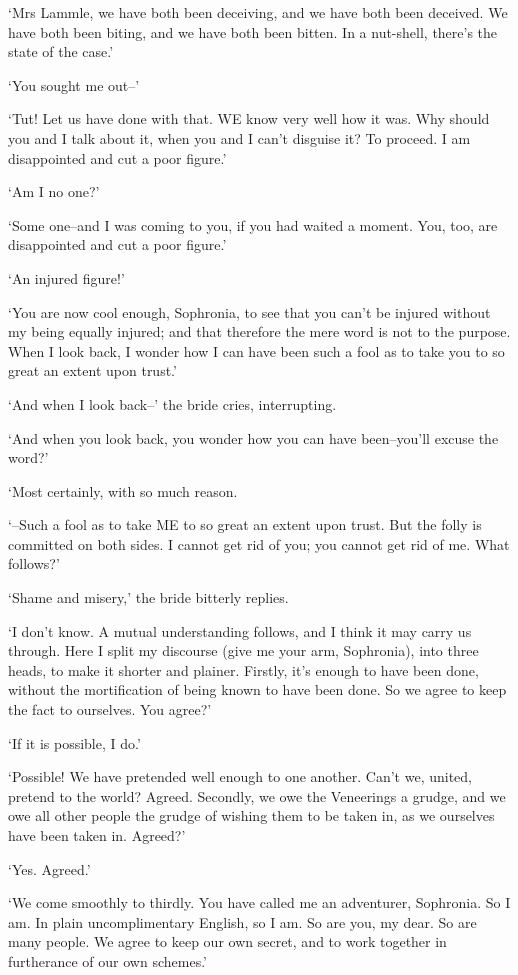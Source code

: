‘Mrs Lammle, we have both been deceiving, and we have both been
deceived. We have both been biting, and we have both been bitten. In a
nut-shell, there’s the state of the case.’

‘You sought me out--’

‘Tut! Let us have done with that. WE know very well how it was. Why
should you and I talk about it, when you and I can’t disguise it? To
proceed. I am disappointed and cut a poor figure.’

‘Am I no one?’

‘Some one--and I was coming to you, if you had waited a moment. You,
too, are disappointed and cut a poor figure.’

‘An injured figure!’

‘You are now cool enough, Sophronia, to see that you can’t be injured
without my being equally injured; and that therefore the mere word is
not to the purpose. When I look back, I wonder how I can have been such
a fool as to take you to so great an extent upon trust.’

‘And when I look back--’ the bride cries, interrupting.

‘And when you look back, you wonder how you can have been--you’ll excuse
the word?’

‘Most certainly, with so much reason.

‘--Such a fool as to take ME to so great an extent upon trust. But the
folly is committed on both sides. I cannot get rid of you; you cannot
get rid of me. What follows?’

‘Shame and misery,’ the bride bitterly replies.

‘I don’t know. A mutual understanding follows, and I think it may carry
us through. Here I split my discourse (give me your arm, Sophronia),
into three heads, to make it shorter and plainer. Firstly, it’s enough
to have been done, without the mortification of being known to have been
done. So we agree to keep the fact to ourselves. You agree?’

‘If it is possible, I do.’

‘Possible! We have pretended well enough to one another. Can’t we,
united, pretend to the world? Agreed. Secondly, we owe the Veneerings
a grudge, and we owe all other people the grudge of wishing them to be
taken in, as we ourselves have been taken in. Agreed?’

‘Yes. Agreed.’

‘We come smoothly to thirdly. You have called me an adventurer,
Sophronia. So I am. In plain uncomplimentary English, so I am. So are
you, my dear. So are many people. We agree to keep our own secret, and
to work together in furtherance of our own schemes.’

